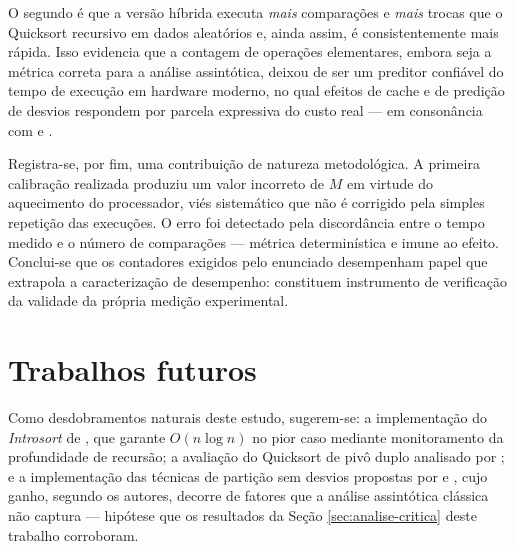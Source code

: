 O segundo é que a versão híbrida executa \textit{mais} comparações e \textit{mais}
trocas que o Quicksort recursivo em dados aleatórios e, ainda assim, é
consistentemente mais rápida. Isso evidencia que a contagem de operações
elementares, embora seja a métrica correta para a análise assintótica, deixou de ser
um preditor confiável do tempo de execução em hardware moderno, no qual efeitos de
cache e de predição de desvios respondem por parcela expressiva do custo real --- em
consonância com  e .

Registra-se, por fim, uma contribuição de natureza metodológica. A primeira
calibração realizada produziu um valor incorreto de $M$ em virtude do aquecimento do
processador, viés sistemático que não é corrigido pela simples repetição das
execuções. O erro foi detectado pela discordância entre o tempo medido e o número de
comparações --- métrica determinística e imune ao efeito. Conclui-se que os
contadores exigidos pelo enunciado desempenham papel que extrapola a caracterização
de desempenho: constituem instrumento de verificação da validade da própria medição
experimental.

\section{Trabalhos futuros}

Como desdobramentos naturais deste estudo, sugerem-se: a implementação do
\textit{Introsort} de , que garante $O(n\log n)$ no pior caso
mediante monitoramento da profundidade de recursão; a avaliação do Quicksort de pivô
duplo analisado por ; e a implementação das técnicas de partição
sem desvios propostas por  e , cujo
ganho, segundo os autores, decorre de fatores que a análise assintótica clássica não
captura --- hipótese que os resultados da Seção \ref{sec:analise-critica} deste
trabalho corroboram.

